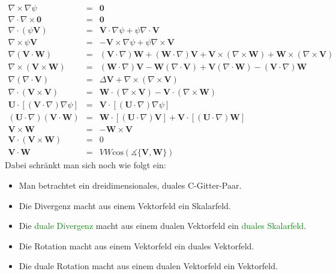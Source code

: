 \documentclass{book}
\renewcommand{\cos}{\text{cos}}
\begin{document}
\begin{eqnarray}
\nabla\times\nabla\psi & = & \mathbf{0}\\
\nabla\cdot\nabla\times{\mathbf{0}} & = & \mathbf{0}\\
\nabla\cdot\left(\psi\mathbf{V}\right) & = & \mathbf{V}\cdot\nabla\psi + \psi\nabla\cdot\mathbf{V}\\
\nabla\times\psi\mathbf{V} & = & -\mathbf{V}\times\nabla\psi + \psi\nabla\times\mathbf{V}\\
\nabla\left(\mathbf{V}\cdot\mathbf{W}\right) & = & \left(\mathbf{V}\cdot\nabla\right)\mathbf{W} + \left(\mathbf{W}\cdot\nabla\right)\mathbf{V} + \mathbf{V}\times\left(\nabla\times\mathbf{W}\right) + \mathbf{W}\times\left(\nabla\times\mathbf{V}\right)\\
\nabla\times\left(\mathbf{V}\times\mathbf{W}\right) & = & \left(\mathbf{W}\cdot\nabla\right)\mathbf{V} - \mathbf{W}\left(\nabla\cdot\mathbf{V}\right) + \mathbf{V}\left(\nabla\cdot\mathbf{W}\right) - \left(\mathbf{V}\cdot\nabla\right)\mathbf{W}\\
\nabla\left(\nabla\cdot\mathbf{V}\right) & = & \Delta\mathbf{V} + \nabla\times\left(\nabla\times\mathbf{V}\right)\\
\nabla\cdot\left(\mathbf{V}\times\mathbf{V}\right) & = & \mathbf{W}\cdot\left(\nabla\times\mathbf{V}\right) - \mathbf{V}\cdot\left(\nabla\times\mathbf{W}\right)\\
\mathbf{U}\cdot\left[\left(\mathbf{V}\cdot\nabla\right)\nabla\psi\right] & = & \mathbf{V}\cdot\left[\left(\mathbf{U}\cdot\nabla\right)\nabla\psi\right]\\
\left(\mathbf{U}\cdot\nabla\right)\left(\mathbf{V}\cdot\mathbf{W}\right) & = & \mathbf{W}\cdot\left[\left(\mathbf{U}\cdot\nabla\right)\mathbf{V}\right] + \mathbf{V}\cdot\left[\left(\mathbf{U}\cdot\nabla\right)\mathbf{W}\right]\\
\mathbf{V}\times\mathbf{W} & = & -\mathbf{W}\times\mathbf{V}\\
\mathbf{V}\cdot\left(\mathbf{V}\times\mathbf{W}\right) & = & 0\\
\mathbf{V}\cdot\mathbf{W} & = & VW\cos\left(\measuredangle\{\mathbf{V}, \mathbf{W}\}\right)
\end{eqnarray}
%
Dabei schränkt man sich noch wie folgt ein:
%
\begin{itemize}
\item Man betrachtet ein dreidimensionales, duales C-Gitter-Paar.
\item Die Divergenz macht aus einem Vektorfeld ein Skalarfeld.
\item Die \textcolor{green}{duale Divergenz} macht aus einem dualen Vektorfeld ein \textcolor{green}{duales Skalarfeld}.
\item Die Rotation macht aus einem Vektorfeld ein duales Vektorfeld.
\item Die duale Rotation macht aus einem dualen Vektorfeld ein Vektorfeld.
\end{itemize}
\end{document}
